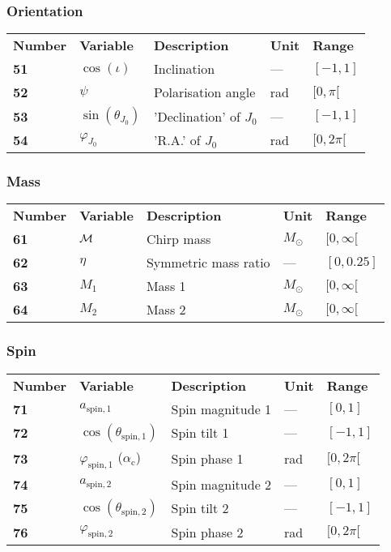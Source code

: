 \documentclass[12pt]{article}
\begin{document}
\subsubsection{Orientation}
\begin{tabular}{lllll}
  \textbf{Number} & \textbf{Variable} & \textbf{Description} & \textbf{Unit} & \textbf{Range} \\
  \textbf{51} & $\cos(\iota)$  & Inclination & --- & $[-1,1]$ \\
  \textbf{52} & $\psi$  & Polarisation angle & rad & $[0,\pi[$ \\
  \textbf{53} & $\sin(\theta_{J_0})$ & 'Declination' of $J_0$ & --- & $[-1,1]$ \\
  \textbf{54} & $\varphi_{J_0}$  & 'R.A.' of $J_0$ & rad & $[0,2\pi[$ \\
\end{tabular}

\subsubsection{Mass}
\begin{tabular}{lllll}
  \textbf{Number} & \textbf{Variable} & \textbf{Description} & \textbf{Unit} & \textbf{Range} \\
  \textbf{61} & $\cal{M}$  & Chirp mass & $M_\odot$ & $[0,\infty[$ \\
  \textbf{62} & $\eta$  & Symmetric mass ratio & --- & $[0,0.25]$ \\
  \textbf{63} & $M_1$  & Mass 1 & $M_\odot$ & $[0,\infty[$ \\
  \textbf{64} & $M_2$  & Mass 2 & $M_\odot$ &  $[0,\infty[$ \\
\end{tabular}

\subsubsection{Spin}
\begin{tabular}{lllll}
  \textbf{Number} & \textbf{Variable} & \textbf{Description} & \textbf{Unit} & \textbf{Range} \\
  \textbf{71} & $a_\mathrm{spin,1}$  & Spin magnitude 1 & --- & $[0,1]$ \\
  \textbf{72} & $\cos(\theta_\mathrm{spin,1})$  & Spin tilt 1 & --- & $[-1,1]$ \\
  \textbf{73} & $\varphi_\mathrm{spin,1}$  ($\alpha_\mathrm{c}$)  & Spin phase 1 & rad & $[0,2\pi[$ \\
  \textbf{74} & $a_\mathrm{spin,2}$  & Spin magnitude 2 & --- & $[0,1]$ \\
  \textbf{75} & $\cos(\theta_\mathrm{spin,2})$  & Spin tilt 2 & --- & $[-1,1]$ \\
  \textbf{76} & $\varphi_\mathrm{spin,2}$  & Spin phase 2 & rad & $[0,2\pi[$ \\
\end{tabular}
\end{document}
